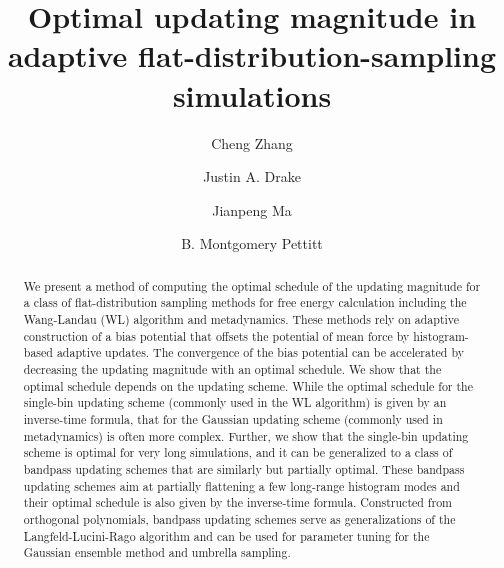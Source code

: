 \documentclass[reprint, superscriptaddress, floatfix]{revtex4-1}
\begin{document}
\title{Optimal updating magnitude in adaptive flat-distribution-sampling simulations}

\author{Cheng Zhang}
\author{Justin A. Drake}
\author{Jianpeng Ma}
\author{B. Montgomery Pettitt}



\begin{abstract}
  We present a method of computing the optimal schedule
  of the updating magnitude
  for a class of flat-distribution sampling methods
  for free energy calculation including
  the Wang-Landau (WL) algorithm and metadynamics.
  These methods rely on adaptive construction of
  a bias potential that offsets
  the potential of mean force by histogram-based adaptive updates.
  The convergence of the bias potential can be accelerated
  by decreasing the updating magnitude with an optimal schedule.
  We show that
  the optimal schedule depends on the updating scheme.
  While the optimal schedule for
  the single-bin updating scheme (commonly used in the WL algorithm)
  is given by an inverse-time formula,
  that for the Gaussian updating scheme (commonly used in metadynamics)
  is often more complex.
  Further,
  we show that the single-bin updating scheme
  is optimal for very long simulations,
  and it can be generalized to a class of bandpass updating schemes
  that are similarly but partially optimal.
  These bandpass updating schemes aim at
  partially flattening a few long-range histogram modes
  and their optimal schedule
  is also given by the inverse-time formula.
  Constructed from orthogonal polynomials,
  bandpass updating schemes serve as generalizations
  of the Langfeld-Lucini-Rago algorithm
  and can be used for parameter tuning for the Gaussian ensemble method
  and umbrella sampling.
\end{abstract}

\maketitle
\end{document}
